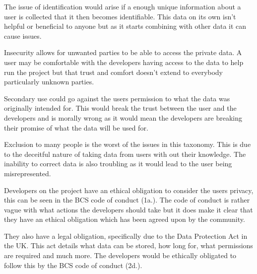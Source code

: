 \documentclass[a4paper]{article}
\begin{document}
\par
The issue of identification would arise if a enough unique information about a user is collected that it then becomes identifiable.
This data on its own isn't helpful or beneficial to anyone but as it starts combining with other data it can cause issues.
\par
Insecurity allows for unwanted parties to be able to access the private data.
A user may be comfortable with the developers having access to the data to help run the project but that trust and comfort doesn't extend to everybody particularly unknown parties.
\par
Secondary use could go against the users permission to what the data was originally intended for.
This would break the trust between the user and the developers and is morally wrong as it would mean the developers are breaking their promise of what the data will be used for.
\par
Exclusion to many people is the worst of the issues in this taxonomy.
This is due to the deceitful nature of taking data from users with out their knowledge.
The inability to correct data is also troubling as it would lead to the user being misrepresented.
\\ \par
Developers on the project have an ethical obligation to consider the users privacy, this can be seen in the BCS code of conduct (1a.)\cite{bscCoC}.
The code of conduct is rather vague with what actions the developers should take but it does make it clear that they have an ethical obligation which has been agreed upon by the community.
\par
They also have a legal obligation, specifically due to the Data Protection Act in the UK\cite{dataProtectionAct}.
This act details what data can be stored, how long for, what permissions are required and much more.
The developers would be ethically obligated to follow this by the BCS code of conduct (2d.)\cite{bscCoC}.
\end{document}
